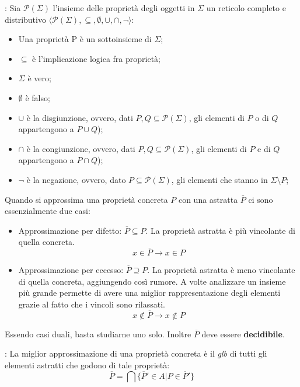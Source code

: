 \documentclass[a4paper,12pt,openany]{article}
\newcommand{\Pp}{\mathcal{P}}
\newenvironment{definition}[1][Definizione]{\begin{trivlist}
\item[\hskip \labelsep {\bfseries #1}]}{\end{trivlist}}
\begin{document}
    \begin{definition}[Reticolo delle proprietà]: Sia $\Pp(\Sigma)$ l'insieme delle proprietà degli oggetti
        in $\Sigma$ un reticolo completo e distributivo 
        $\langle \Pp(\Sigma), \subseteq, \emptyset, \cup, \cap, \neg \rangle$:
        \begin{itemize}
            \item Una proprietà P è un sottoinsieme di $\Sigma$;
            \item $\subseteq$ è l'implicazione logica fra proprietà;
            \item $\Sigma$ è vero;
            \item $\emptyset$ è falso;
            \item $\cup$ è la disgiunzione, ovvero, dati $P,Q \subseteq \Pp(\Sigma)$,
                gli elementi di $P$ o di $Q$ appartengono a $P \cup Q$);
            \item $\cap$ è la congiunzione, ovvero, dati $P,Q \subseteq \Pp(\Sigma)$,
                gli elementi di $P$ e di $Q$ appartengono a $P \cap Q$);
            \item $\neg$ è la negazione, ovvero, dato $P \subseteq \Pp(\Sigma)$,
                gli elementi che stanno in $\Sigma \setminus P$;
        \end{itemize}
    \end{definition}
    
    Quando si approssima una proprietà concreta $P$ con una astratta $\overline{P}$ ci sono essenzialmente
    due casi:
    \begin{itemize}
        \item Approssimazione per difetto: $\overline{P} \subseteq P$. La proprietà astratta è più vincolante
            di quella concreta. $$x \in \overline{P} \to x \in P$$
        \item Approssimazione per eccesso: $\overline{P} \supseteq P$. La proprietà astratta è meno vincolante
        di quella concreta, aggiungendo così rumore. A volte analizzare un insieme più grande permette
        di avere una miglior rappresentazione degli elementi grazie al fatto che i vincoli sono rilassati.
        $$x \notin \overline{P} \to x \notin P$$
    \end{itemize}
    Essendo casi duali, basta studiarne uno solo. Inoltre $\overline{P}$ deve essere \textbf{decidibile}.
    
    \begin{definition}[Miglior astrazione]: La miglior approssimazione di una proprietà concreta è il \emph{glb}
            di tutti gli elementi astratti che godono di tale proprietà:
            $$\overline{P} = \bigcap\{\overline{P}' \in A | P \in \overline{P}' \}$$
    \end{definition}
    
\end{document}
